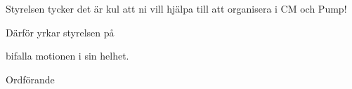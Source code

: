 \documentclass[../_main/handlingar.tex]{subfiles}
\begin{document}
\motionssvar

Styrelsen tycker det är kul att ni vill hjälpa till att organisera i CM och Pump!

Därför yrkar styrelsen på
\begin{attsatser}
    \att bifalla motionen i sin helhet.
\end{attsatser}

\begin{signatures}{1}
    \ist
    \signature{Erik Månsson}{Ordförande}
\end{signatures}
\end{document}
